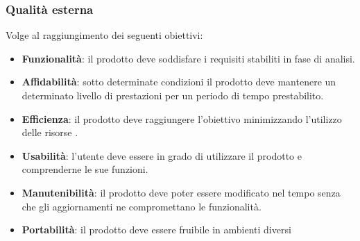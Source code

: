\subsubsection{Qualità esterna}
Volge al raggiungimento dei seguenti obiettivi:
\begin{itemize}
    \item \textbf{Funzionalità}: il prodotto deve soddisfare i requisiti stabiliti in fase di analisi.
    \item \textbf{Affidabilità}: sotto determinate condizioni il prodotto deve mantenere un determinato livello di prestazioni per un periodo di tempo prestabilito.
    \item \textbf{Efficienza}: il prodotto deve raggiungere l'obiettivo minimizzando l'utilizzo delle risorse .
    \item \textbf{Usabilità}: l'utente deve essere in grado di utilizzare il prodotto e comprenderne le sue funzioni.
    \item \textbf{Manutenibilità}: il prodotto deve poter essere modificato nel tempo senza che gli aggiornamenti ne compromettano le funzionalità.
    \item \textbf{Portabilità}: il prodotto deve essere fruibile in ambienti diversi
\end{itemize}
